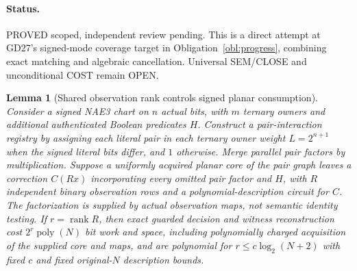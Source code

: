 \documentclass[11pt]{article}
\newtheorem{lemma}[theorem]{Lemma}
\begin{document}
\paragraph{Status.} PROVED scoped, independent review pending. This is a direct attempt at GD27's signed-mode coverage target in Obligation~\ref{obl:progress}, combining exact matching and algebraic cancellation. Universal SEM/CLOSE and unconditional COST remain OPEN.
\begin{lemma}[Shared observation rank controls signed planar consumption]\label{lem:bd20-planar}
Consider a signed NAE3 chart on $n$ actual bits, with $m$ ternary owners and additional authenticated Boolean predicates $H$. Construct a pair-interaction registry by assigning each literal pair in each ternary owner weight $L=2^{n+1}$ when the signed literal bits differ, and $1$ otherwise. Merge parallel pair factors by multiplication. Suppose a uniformly acquired planar core of the pair graph leaves a correction $C(Rx)$ incorporating every omitted pair factor and $H$, with $R$ independent binary observation rows and a polynomial-description circuit for $C$. The factorization is supplied by actual observation maps, not semantic identity testing. If $r=\operatorname{rank}R$, then exact guarded decision and witness reconstruction cost $2^r\operatorname{poly}(N)$ bit work and space, including polynomially charged acquisition of the supplied core and maps, and are polynomial for $r\le c\log_2(N+2)$ with fixed $c$ and fixed original-$N$ description bounds.
\end{lemma}
\end{document}
